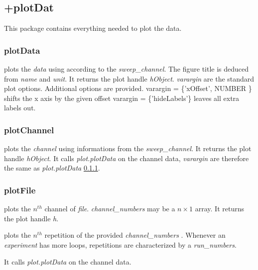 \subsection{+plotDat}
This package contains everything needed to plot the data.
\subsubsection{plotData}
\label{dat::plotData}
\bdf
{} plots the \emph{data} using according to the \emph{sweep\_channel}. The figure title is deduced from \emph{name} and \emph{unit}. It returns the plot handle \emph{hObject}. \emph{varargin} are the standard plot options. Additional options are provided.
\bi
\+ varargin = \{'xOffset', NUMBER \} shifts the x axis by the given offset
\+ varargin = \{'hideLabels'\} leaves all extra labels out.
\ei
\edf
\subsubsection{plotChannel}
\bdf
{} plots the \emph{channel} using informations from the \emph{sweep\_channel}. It returns the plot handle  \emph{hObject}. It calls \emph{plot.plotData} on the channel data, \emph{varargin} are therefore the same as \emph{plot.plotData} \ref{dat::plotData}.
\edf


\subsubsection{plotFile}

\bdf
{} plots the $n^{th}$ channel of \emph{file}. \emph{channel\_numbers} may be a $n \times 1$ array. It returns the plot handle \emph{h}.

 plots the $n^{th}$ repetition of the provided \emph{channel\_numbers} . Whenever an \emph{experiment} has more loops, repetitions are characterized by a \emph{run\_numbers}.
\edf

It calls \emph{plot.plotData} on the channel data.

